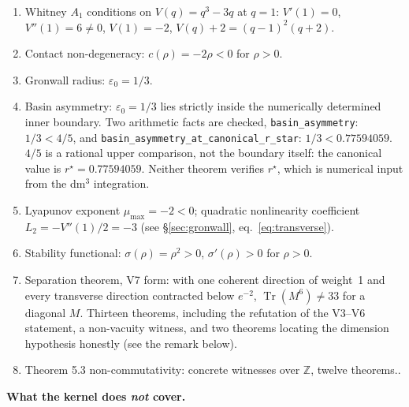 \documentclass[14pt,a4paper]{extarticle}
\begin{document}
\begin{enumerate}[label=\textbf{P\arabic*.},leftmargin=3em]
  \item Whitney $A_1$ conditions on $V(q) = q^3-3q$ at $q=1$:
    $V'(1)=0$, $V''(1)=6\neq 0$, $V(1)=-2$,
    $V(q)+2=(q-1)^2(q+2)$.
  \item Contact non-degeneracy: $c(\rho)=-2\rho < 0$ for $\rho > 0$.
  \item Gronwall radius: $\varepsilon_0 = 1/3$.
  \item Basin asymmetry: $\varepsilon_0 = 1/3$ lies strictly inside the
    numerically determined inner boundary. Two arithmetic facts are
    checked, \texttt{basin\_asymmetry}: $1/3 < 4/5$, and
    \texttt{basin\_asymmetry\_at\_canonical\_r\_star}:
    $1/3 < 0.77594059$.
        $4/5$ is a rational upper comparison, not the boundary itself: the
    canonical value is $r^\star = 0.77594059$. Neither theorem verifies
    $r^\star$, which is numerical input from the dm$^3$ integration.
  \item Lyapunov exponent $\mu_{\max}=-2 < 0$; quadratic nonlinearity coefficient $L_2 = -V''(1)/2 = -3$ (see \S\ref{sec:gronwall}, eq.~\eqref{eq:transverse}).
  \item Stability functional: $\sigma(\rho)=\rho^2 > 0$,
    $\sigma'(\rho) > 0$ for $\rho > 0$.
  \item Separation theorem, V7 form: with one coherent direction of
    weight~1 and every transverse direction contracted below $e^{-2}$,
    $\operatorname{Tr}(M^6) \neq 33$ for a diagonal $M$. Thirteen theorems,
    including the refutation of the V3--V6 statement, a non-vacuity
    witness, and two theorems locating the dimension hypothesis honestly
    (see the remark below).
  \item Theorem 5.3 non-commutativity: concrete witnesses over
    $\mathbb{Z}$, twelve theorems..
\end{enumerate}

\medskip
\noindent\textbf{What the kernel does \emph{not} cover.}
\end{document}
